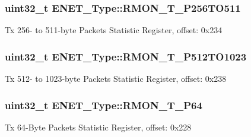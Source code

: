 \subsubsection[{\texorpdfstring{R\+M\+O\+N\+\_\+\+T\+\_\+\+P256\+T\+O511}{RMON_T_P256TO511}}]{ uint32\+\_\+t E\+N\+E\+T\+\_\+\+Type\+::\+R\+M\+O\+N\+\_\+\+T\+\_\+\+P256\+T\+O511}\hypertarget{structENET__Type_a179dc81d006def74ca3366e6b3a6c34b}{}\label{structENET__Type_a179dc81d006def74ca3366e6b3a6c34b}
Tx 256-\/ to 511-\/byte Packets Statistic Register, offset\+: 0x234 
\subsubsection[{\texorpdfstring{R\+M\+O\+N\+\_\+\+T\+\_\+\+P512\+T\+O1023}{RMON_T_P512TO1023}}]{ uint32\+\_\+t E\+N\+E\+T\+\_\+\+Type\+::\+R\+M\+O\+N\+\_\+\+T\+\_\+\+P512\+T\+O1023}\hypertarget{structENET__Type_adf766f375644d93ae5f495b0d3a5a734}{}\label{structENET__Type_adf766f375644d93ae5f495b0d3a5a734}
Tx 512-\/ to 1023-\/byte Packets Statistic Register, offset\+: 0x238 
\subsubsection[{\texorpdfstring{R\+M\+O\+N\+\_\+\+T\+\_\+\+P64}{RMON_T_P64}}]{ uint32\+\_\+t E\+N\+E\+T\+\_\+\+Type\+::\+R\+M\+O\+N\+\_\+\+T\+\_\+\+P64}\hypertarget{structENET__Type_ad6c5df37a518e4a783d0ec74bc14b2cb}{}\label{structENET__Type_ad6c5df37a518e4a783d0ec74bc14b2cb}
Tx 64-\/\+Byte Packets Statistic Register, offset\+: 0x228 
